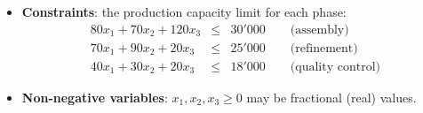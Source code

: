 \begin{examplebox}
\begin{itemize}
        \item \textbf{Constraints}: the production capacity limit for each phase:
        \begin{equation*}
            \begin{array}{rcl}
                80x_{1} + 70x_{2} + 120x_{3} &\le& 30'000 \hspace{2em} \text{(assembly)} \\ [.5em]
                70x_{1} + 90x_{2} + 20x_{3} &\le& 25'000 \hspace{2em} \text{(refinement)} \\ [.5em]
                40x_{1} + 30x_{2} + 20x_{3} &\le& 18'000 \hspace{2em} \text{(quality control)}
            \end{array}
        \end{equation*}

        \item \textbf{Non-negative variables}: $x_{1}, x_{2}, x_{3} \ge 0$ may be fractional (real) values.
    \end{itemize}
\end{examplebox}

